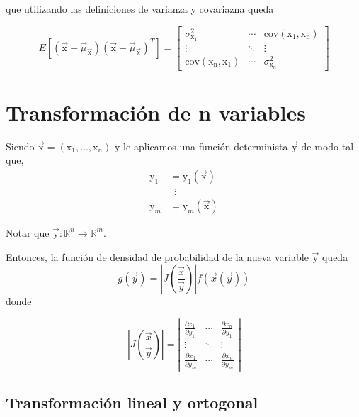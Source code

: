 \documentclass[openany]{book}
\begin{document}
que utilizando las definiciones de varianza y covariazna queda

\begin{equation}
  \label{eq:matriz-var-cov}
  E\left[(\vec{\mathrm{x}}-\vec{\mu}_{\vec{\mathrm{x}}})(\vec{\mathrm{x}}-\vec{\mu}_{\vec{\mathrm{x}}})^T\right]=\begin{bmatrix} \sigma^{2}_{\mathrm{x}_1} & \cdots & \mathrm{cov(x_{1},x_{n})} \\
    \vdots & \ddots & \vdots \\
    \mathrm{cov(x_{n},x_{1})} & \cdots & \sigma^{2}_{\mathrm{x}_n} \end{bmatrix}
\end{equation}

\section{Transformación de n variables}
Siendo $\vec{\mathrm{x}}=(\mathrm{x_1},\dots,\mathrm{x}_{n})$ y le aplicamos una función determinista $\vec{\mathrm{y}}$ de modo tal que,
\begin{align*}
  \mathrm{y}_1&=\mathrm{y}_1(\vec{\mathrm{x}})\\
  &\,\,\,\vdots\\ 
  \mathrm{y}_{m}&=\mathrm{y}_{m}(\vec{\mathrm{x}})
\end{align*}

\par Notar que $\vec{\mathrm{y}}:\mathbb{R}^{n}\rightarrow\mathbb{R}^{m}$.
\par Entonces, la función de densidad de probabilidad de la nueva variable $\vec{\mathrm{y}}$ queda
\begin{equation}
  g(\vec{y})=\left|J \left(\frac{\vec{x}}{\vec{y}}\right)\right|f(\vec{x}(\vec{y}))
  \label{eq:transfor-nvar}
\end{equation}
donde 

\begin{equation*}
  \left|J \left(\frac{\vec{x}}{\vec{y}}\right)\right|=\left|\begin{matrix} \frac{\partial x_1}{\partial y_1} & \cdots & \frac{\partial x_{n}}{\partial y_1} \\
  \vdots & \ddots & \vdots \\ 
  \frac{\partial x_{1}}{\partial y_{m}} & \cdots & \frac{\partial x_{n}}{\partial y_{m}} \end{matrix}\right|
\end{equation*}

\subsection{Transformación lineal y ortogonal}
\end{document}
